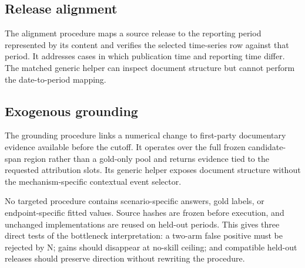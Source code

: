 \subsection{Release alignment}
The alignment procedure maps a source release to the reporting period represented by its content and verifies the selected time-series row against that period. It addresses cases in which publication time and reporting time differ. The matched generic helper can inspect document structure but cannot perform the date-to-period mapping.

\subsection{Exogenous grounding}
The grounding procedure links a numerical change to first-party documentary evidence available before the cutoff. It operates over the full frozen candidate-span region rather than a gold-only pool and returns evidence tied to the requested attribution slots. Its generic helper exposes document structure without the mechanism-specific contextual event selector.

No targeted procedure contains scenario-specific answers, gold labels, or endpoint-specific fitted values. Source hashes are frozen before execution, and unchanged implementations are reused on held-out periods. This gives three direct tests of the bottleneck interpretation: a two-arm false positive must be rejected by N; gains should disappear at no-skill ceiling; and compatible held-out releases should preserve direction without rewriting the procedure.
